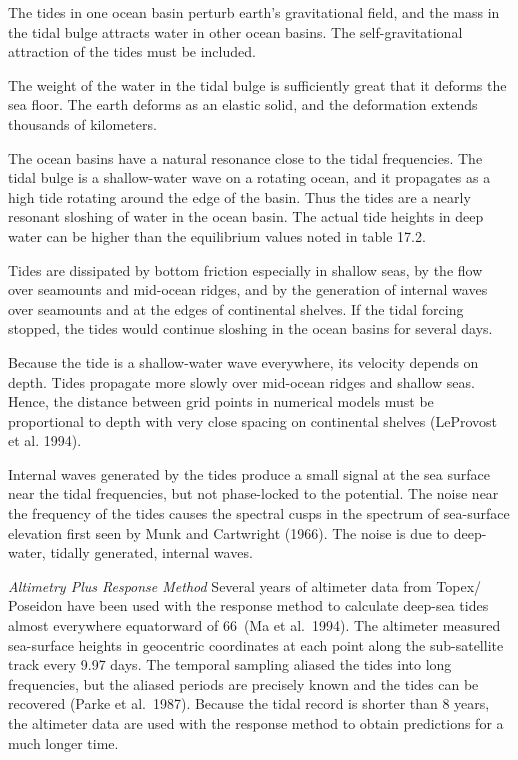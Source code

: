 \begin{enumerate}
\vitem The tides in one ocean basin perturb earth's gravitational
field, and the mass in the tidal bulge attracts water in other ocean
basins. The self-gravitational attraction of the tides must be
included.

\vitem The weight of the water in the tidal bulge is sufficiently
great that it deforms the sea floor. The earth deforms as an elastic
solid, and the deformation extends thousands of kilometers.

\vitem The ocean basins have a natural resonance close to the tidal
frequencies. The tidal bulge is a shallow-water wave on a rotating
ocean, and it propagates as a high tide rotating around the edge of
the basin. Thus the tides are a nearly resonant sloshing of water in
the ocean basin. The actual tide heights in deep water can be higher
than the equilibrium values noted in table 17.2.

\vitem Tides are dissipated by bottom friction especially in shallow
seas, by the flow over seamounts and mid-ocean ridges, and by the
generation of internal waves over seamounts and at the edges of
continental shelves. If the tidal forcing stopped, the tides would
continue sloshing in the ocean basins for several days.

\vitem Because the tide is a shallow-water wave everywhere, its
velocity depends on depth.  Tides propagate more slowly over mid-ocean
ridges and shallow seas. Hence, the distance between grid points in
numerical models must be proportional to depth with very close spacing
on continental shelves (LeProvost et al. 1994).

\vitem Internal waves generated by the tides produce a small signal at
the sea surface near the tidal frequencies, but not phase-locked to
the potential. The noise near the frequency of the tides causes the
spectral cusps in the spectrum of sea-surface elevation first seen by
Munk and Cartwright (1966). The noise is due to deep-water, tidally
generated, internal waves.
\end{enumerate}

\textit{Altimetry Plus Response Method} Several years of altimeter
data from 
Topex/ Poseidon have been used with the response
method to calculate deep-sea tides almost everywhere equatorward of
66\degrees\ (Ma et al.\ 1994). The altimeter measured sea-surface
heights in geocentric coordinates at each point along the
sub-satellite track every 9.97 days. The temporal sampling aliased the
tides into long frequencies, but the aliased periods are precisely
known and the tides can be recovered (Parke et al.\ 1987).  Because
the tidal record is shorter than 8 years, the altimeter data are used
with the response method to obtain predictions for a much longer time.

